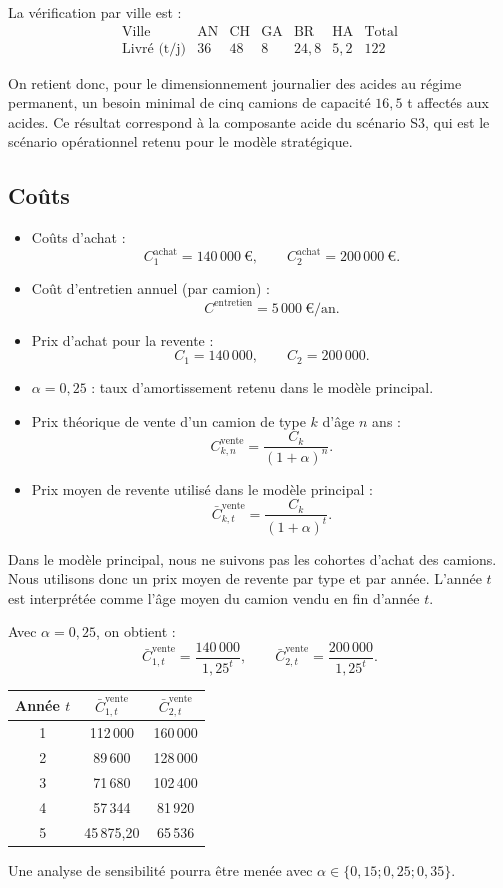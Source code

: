 \documentclass{article}
\begin{document}
La vérification par ville est :
\[
\begin{array}{c|ccccc|c}
\text{Ville} & \mathrm{AN} & \mathrm{CH} & \mathrm{GA} & \mathrm{BR} & \mathrm{HA} & \text{Total} \\
\hline
\text{Livré (t/j)} & 36 & 48 & 8 & 24{,}8 & 5{,}2 & 122
\end{array}
\]

On retient donc, pour le dimensionnement journalier des acides au régime permanent,
un besoin minimal de cinq camions de capacité $16{,}5$ t affectés aux acides.
Ce résultat correspond à la composante acide du scénario S3, qui est le scénario
opérationnel retenu pour le modèle stratégique.


\subsection{Coûts}

\begin{itemize}
  \item Coûts d'achat :
  \[
    C^{\text{achat}}_1 = 140\,000~\text{€}, \qquad
    C^{\text{achat}}_2 = 200\,000~\text{€}.
  \]
  \item Coût d'entretien annuel (par camion) :
  \[
    C^{\text{entretien}} = 5\,000~\text{€}/\text{an}.
  \]
  \item Prix d'achat pour la revente :
  \[
    C_1 = 140\,000, \qquad C_2 = 200\,000.
  \]
  \item $\alpha = 0{,}25$ : taux d'amortissement retenu dans le modèle principal.
  \item Prix théorique de vente d'un camion de type $k$ d'âge $n$ ans :
  \[
    C^{\text{vente}}_{k,n} = \frac{C_k}{(1+\alpha)^n}.
  \]
  \item Prix moyen de revente utilisé dans le modèle principal :
  \[
    \bar C^{\text{vente}}_{k,t}
    =
    \frac{C_k}{(1+\alpha)^t}.
  \]
\end{itemize}
Dans le modèle principal, nous ne suivons pas les cohortes d'achat des camions.
Nous utilisons donc un prix moyen de revente par type et par année. L'année $t$
est interprétée comme l'âge moyen du camion vendu en fin d'année $t$.

Avec $\alpha = 0{,}25$, on obtient :
\[
  \bar C^{\text{vente}}_{1,t}
  =
  \frac{140\,000}{1{,}25^t},
  \qquad
  \bar C^{\text{vente}}_{2,t}
  =
  \frac{200\,000}{1{,}25^t}.
\]

\begin{center}
\begin{tabular}{c|cc}
\hline
Année $t$ & $\bar C^{\text{vente}}_{1,t}$ & $\bar C^{\text{vente}}_{2,t}$ \\
\hline
1 & 112\,000 & 160\,000 \\
2 & 89\,600 & 128\,000 \\
3 & 71\,680 & 102\,400 \\
4 & 57\,344 & 81\,920 \\
5 & 45\,875{,}20 & 65\,536 \\
\hline
\end{tabular}
\end{center}
Une analyse de sensibilité pourra être menée avec
$\alpha \in \{0{,}15;0{,}25;0{,}35\}$.
\end{document}
